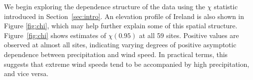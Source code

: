\documentclass[
  12pt]{article}
\begin{document}

We begin exploring the dependence structure of the data using the $\chi$ statistic introduced in Section~\ref{sec:intro}. 
An elevation profile of Ireland is also shown in Figure \ref{fig:chi}, which may help further explain some of this spatial structure.
Figure~\ref{fig:chi} shows estimates of $\chi(0.95)$ at all 59 sites.
Positive values are observed at almost all sites, indicating varying degrees of positive asymptotic dependence between precipitation and wind speed. 
In practical terms, this suggests that extreme wind speeds tend to be accompanied by high precipitation, and vice versa. 
\end{document}
